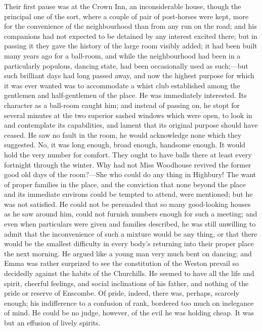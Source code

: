 Their first pause was at the Crown Inn, an inconsiderable house,
though the principal one of the sort, where a couple of pair of
post-horses were kept, more for the convenience of the neighbourhood
than from any run on the road; and his companions had not expected
to be detained by any interest excited there; but in passing it they
gave the history of the large room visibly added; it had been built
many years ago for a ball-room, and while the neighbourhood had been
in a particularly populous, dancing state, had been occasionally used
as such;---but such brilliant days had long passed away, and now the
highest purpose for which it was ever wanted was to accommodate a whist
club established among the gentlemen and half-gentlemen of the place.
He was immediately interested.  Its character as a ball-room caught him;
and instead of passing on, he stopt for several minutes at the two
superior sashed windows which were open, to look in and contemplate
its capabilities, and lament that its original purpose should
have ceased.  He saw no fault in the room, he would acknowledge
none which they suggested.  No, it was long enough, broad enough,
handsome enough.  It would hold the very number for comfort.
They ought to have balls there at least every fortnight through
the winter.  Why had not Miss Woodhouse revived the former good
old days of the room?---She who could do any thing in Highbury!
The want of proper families in the place, and the conviction
that none beyond the place and its immediate environs could be
tempted to attend, were mentioned; but he was not satisfied.
He could not be persuaded that so many good-looking houses as he saw
around him, could not furnish numbers enough for such a meeting;
and even when particulars were given and families described, he was
still unwilling to admit that the inconvenience of such a mixture
would be any thing, or that there would be the smallest difficulty
in every body's returning into their proper place the next morning.
He argued like a young man very much bent on dancing; and Emma
was rather surprized to see the constitution of the Weston prevail
so decidedly against the habits of the Churchills.  He seemed to have
all the life and spirit, cheerful feelings, and social inclinations
of his father, and nothing of the pride or reserve of Enscombe.
Of pride, indeed, there was, perhaps, scarcely enough; his indifference
to a confusion of rank, bordered too much on inelegance of mind.
He could be no judge, however, of the evil he was holding cheap.
It was but an effusion of lively spirits.

